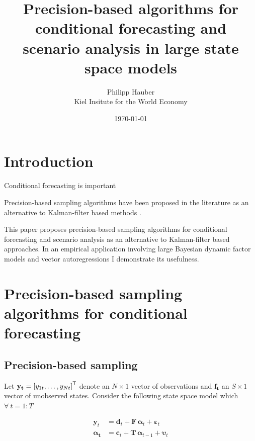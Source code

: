 \documentclass[notitlepage,a4paper,12pt]{article}
\newcommand{\transpose}[1]{{#1}^{\sf{T}}}
\begin{document}
\title{Precision-based algorithms for conditional forecasting and scenario analysis in large state space models}

\author{
  Philipp Hauber\\
  Kiel Insitute for the World Economy
}
\date{\today}

\maketitle

\section{Introduction}

Conditional forecasting is important \citep{bgl_2015ijf}

Precision-based sampling algorithms have been proposed in the literature as an alternative to Kalman-filter based methods \citep{chanjeliazkov_2009}.

This paper proposes precision-based sampling algorithms for conditional forecasting and scenario analysis as an alternative to Kalman-filter based approaches. In an empirical application involving large Bayesian dynamic factor models and vector autoregressions I demonstrate its usefulness. 

\section{Precision-based sampling algorithms for conditional forecasting}\label{sec:precsampler}

\subsection{Precision-based sampling}

Let $\mathbf{y_t} = \transpose{[y_{1t}, \dots, y_{Nt}]}$ denote an $N \times 1$ vector of observations and $\mathbf{f_t}$ an $S \times 1$ vector of unobserved states. Consider the following state space model which $\forall \: t = 1:T$ 

\begin{subequations}
    \label{eqn:statespacesys}
    \begin{align}
        \mathbf{y}_t &= \mathbf{d}_t + \mathbf{F} \,\boldsymbol{\alpha}_t + \boldsymbol{\varepsilon}_t \label{eqn:statespacesys_meas}\\
        \boldsymbol{\alpha_t} &= \mathbf{c}_t + \mathbf{T} \, \boldsymbol{\alpha}_{t-1} + \boldsymbol{\upsilon}_t \label{eqn:statespacesys_trans}
    \end{align}
\end{subequations}
\end{document}
